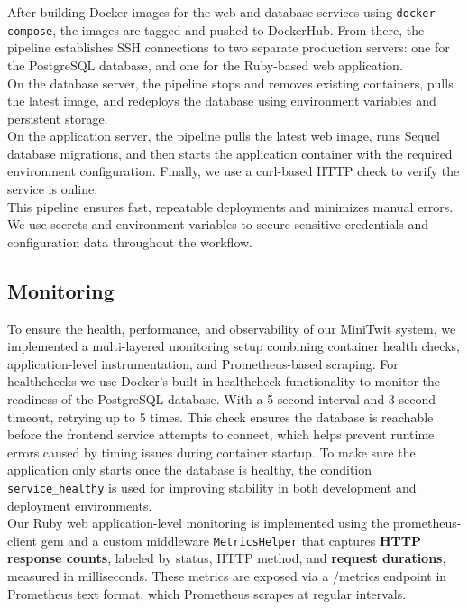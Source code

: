 After building Docker images for the web and database services using \texttt{docker compose}, the images are tagged and pushed to DockerHub. From there, the pipeline establishes SSH connections to two separate production servers: one for the PostgreSQL database, and one for the Ruby-based web application. \\

On the database server, the pipeline stops and removes existing containers, pulls the latest image, and redeploys the database using environment variables and persistent storage. \\

On the application server, the pipeline pulls the latest web image, runs Sequel database migrations, and then starts the application container with the required environment configuration. Finally, we use a curl-based HTTP check to verify the service is online. \\

This pipeline ensures fast, repeatable deployments and minimizes manual errors. We use secrets and environment variables to secure sensitive credentials and configuration data throughout the workflow.


\subsection{Monitoring}
To ensure the health, performance, and observability of our MiniTwit system, we implemented a multi-layered monitoring setup combining container health checks, application-level instrumentation, and Prometheus-based scraping.
For healthchecks we use Docker’s built-in healthcheck functionality to monitor the readiness of the PostgreSQL database. With a 5-second interval and 3-second timeout, retrying up to 5 times. This check ensures the database is reachable before the frontend service attempts to connect, which helps prevent runtime errors caused by timing issues during container startup. To make sure the application only starts once the database is healthy, the condition \texttt{service\_healthy} is used for improving stability in both development and deployment environments. \\

Our Ruby web application-level monitoring is implemented using the prometheus-client gem and a custom middleware \texttt{MetricsHelper} that captures \textbf{HTTP response counts}, labeled by status, HTTP method, and \textbf{request durations}, measured in milliseconds. These metrics are exposed via a /metrics endpoint in Prometheus text format, which Prometheus scrapes at regular intervals. \\

